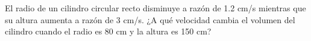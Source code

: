\item El radio de un cilindro circular recto disminuye a razón de 1.2 cm/s mientras que su altura aumenta a razón de 3 cm/s. ¿A qué velocidad cambia el volumen del cilindro cuando el radio es 80 cm y la altura es 150 cm?
